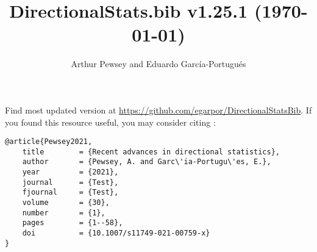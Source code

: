 \documentclass[10pt]{article}
\title{DirectionalStats.bib v1.25.1 (\today)}
\author{Arthur Pewsey and Eduardo García-Portugués}
\date{}
\begin{document}
\maketitle

Find most updated version at \url{https://github.com/egarpor/DirectionalStatsBib}. If you found this resource useful, you may consider citing \cite{Pewsey2021}:
\begin{verbatim}
@article{Pewsey2021,
    title        = {Recent advances in directional statistics},
    author       = {Pewsey, A. and Garc\'ia-Portugu\'es, E.},
    year         = {2021},
    journal      = {Test},
    fjournal     = {Test},
    volume       = {30},
    number       = {1},
    pages        = {1--58},
    doi          = {10.1007/s11749-021-00759-x}
}
\end{verbatim}

\nocite{*}

\setlength\bibsep{0cm}
\setlength\bibhang{0.25cm}



\end{document}
